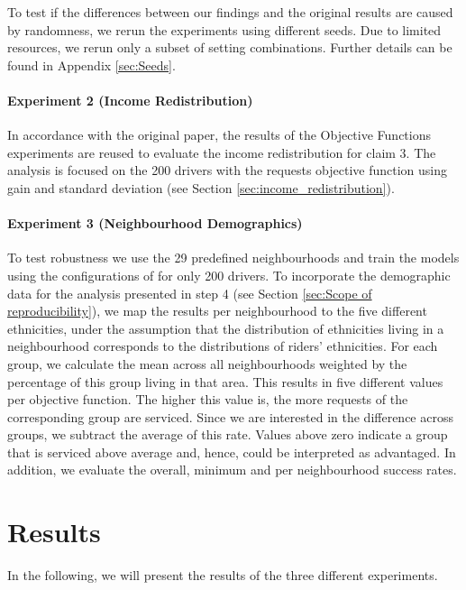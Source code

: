 To test if the differences between our findings and the original results are caused by randomness, we rerun the experiments using different seeds. Due to limited resources, we rerun only a subset of setting combinations. Further details can be found in Appendix \ref{sec:Seeds}.

\paragraph{Experiment 2 (Income Redistribution)} In accordance with the original paper, the results of the Objective Functions experiments are reused to evaluate the income redistribution for claim 3. The analysis is focused on the 200 drivers with the requests objective function using gain and standard deviation (see Section \ref{sec:income_redistribution}).

\paragraph{Experiment 3 (Neighbourhood Demographics)} To test robustness we use the 29 predefined neighbourhoods and train the models using the configurations of  for only 200 drivers. To incorporate the demographic data for the analysis presented in step 4 (see Section \ref{sec:Scope of reproducibility}), we map the results per neighbourhood to the five different ethnicities, under the assumption that the distribution of ethnicities living in a neighbourhood corresponds to the distributions of riders' ethnicities. For each group, we calculate the mean across all neighbourhoods weighted by the percentage of this group living in that area. This results in five different values per objective function. The higher this value is, the more requests of the corresponding group are serviced. Since we are interested in the difference across groups, we subtract the average of this rate. Values above zero indicate a group that is serviced above average and, hence, could be interpreted as advantaged. In addition, we evaluate the overall, minimum and per neighbourhood success rates.





\section{Results} \label{sec:Results}

In the following, we will present the results of the three different experiments.



